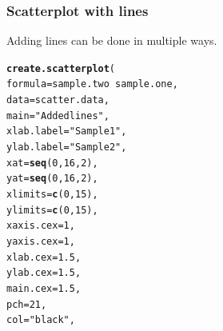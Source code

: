 \documentclass[letterpaper]{report}\usepackage[]{graphicx}\usepackage[]{color}
\makeatletter
\newcommand{\hlnum}[1]{\textcolor[rgb]{0.686,0.059,0.569}{#1}}%
\newcommand{\hlstr}[1]{\textcolor[rgb]{0.192,0.494,0.8}{#1}}%
\newcommand{\hlopt}[1]{\textcolor[rgb]{0,0,0}{#1}}%
\newcommand{\hlstd}[1]{\textcolor[rgb]{0.345,0.345,0.345}{#1}}%
\newcommand{\hlkwc}[1]{\textcolor[rgb]{0.333,0.667,0.333}{#1}}%
\newcommand{\hlkwd}[1]{\textcolor[rgb]{0.737,0.353,0.396}{\textbf{#1}}}%
\newenvironment{kframe}{%
 \def\at@end@of@kframe{}%
 \ifinner\ifhmode%
  \def\at@end@of@kframe{\end{minipage}}%
  \begin{minipage}{\columnwidth}%
 \fi\fi%
 \def\FrameCommand##1{\hskip\@totalleftmargin \hskip-\fboxsep
 \colorbox{shadecolor}{##1}\hskip-\fboxsep
     \hskip-\linewidth \hskip-\@totalleftmargin \hskip\columnwidth}%
 \MakeFramed {\advance\hsize-\width
   \@totalleftmargin\z@ \linewidth\hsize
   \@setminipage}}%
 {\par\unskip\endMakeFramed%
 \at@end@of@kframe}
\newenvironment{knitrout}{}{} %
\makeatother
\begin{document}
\subsubsection{Scatterplot with lines}
Adding lines can be done in multiple ways.
\begin{knitrout}
\color{fgcolor}\begin{kframe}
\begin{alltt}
\hlkwd{create.scatterplot}\hlstd{(}
    \hlkwc{formula} \hlstd{= sample.two} \hlopt{~} \hlstd{sample.one,}
    \hlkwc{data} \hlstd{= scatter.data,}
    \hlkwc{main} \hlstd{=} \hlstr{"Added lines"}\hlstd{,}
    \hlkwc{xlab.label} \hlstd{=} \hlstr{"Sample 1"}\hlstd{,}
    \hlkwc{ylab.label} \hlstd{=} \hlstr{"Sample 2"}\hlstd{,}
    \hlkwc{xat} \hlstd{=} \hlkwd{seq}\hlstd{(}\hlnum{0}\hlstd{,} \hlnum{16}\hlstd{,} \hlnum{2}\hlstd{),}
    \hlkwc{yat} \hlstd{=} \hlkwd{seq}\hlstd{(}\hlnum{0}\hlstd{,} \hlnum{16}\hlstd{,} \hlnum{2}\hlstd{),}
    \hlkwc{xlimits} \hlstd{=} \hlkwd{c}\hlstd{(}\hlnum{0}\hlstd{,} \hlnum{15}\hlstd{),}
    \hlkwc{ylimits} \hlstd{=} \hlkwd{c}\hlstd{(}\hlnum{0}\hlstd{,} \hlnum{15}\hlstd{),}
    \hlkwc{xaxis.cex} \hlstd{=} \hlnum{1}\hlstd{,}
    \hlkwc{yaxis.cex} \hlstd{=} \hlnum{1}\hlstd{,}
    \hlkwc{xlab.cex} \hlstd{=} \hlnum{1.5}\hlstd{,}
    \hlkwc{ylab.cex} \hlstd{=} \hlnum{1.5}\hlstd{,}
    \hlkwc{main.cex} \hlstd{=} \hlnum{1.5}\hlstd{,}
    \hlkwc{pch} \hlstd{=} \hlnum{21}\hlstd{,}
    \hlkwc{col} \hlstd{=} \hlstr{"black"}\hlstd{,}


\end{alltt}
\end{kframe}
\end{knitrout}
\end{document}

